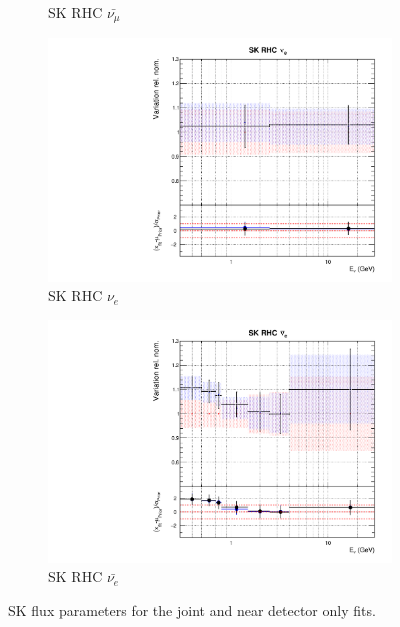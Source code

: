 \begin{figure}[!htbp]
\begin{subfigure}{0.45\textwidth}
  \caption{SK RHC $\bar{\nu_{\mu}}$}
\end{subfigure}
\begin{subfigure}{0.45\textwidth}
  \centering
  \includegraphics[width=0.75\linewidth]{figs/jointflux14}
  \caption{SK RHC $\nu_{e}$}
\end{subfigure}
\begin{subfigure}{0.45\textwidth}
  \centering
  \includegraphics[width=0.75\linewidth]{figs/jointflux15}
  \caption{SK RHC $\bar{\nu_e}$}
\end{subfigure}
\caption{SK flux parameters for the joint and near detector only fits.}
\label{fig:jointfluxSK}
\end{figure}

